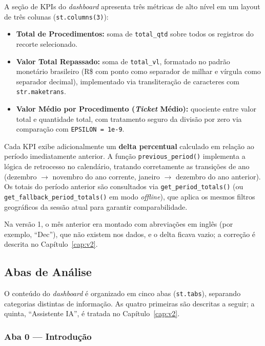 \documentclass[12pt,a4paper]{report}
\begin{document}
A seção de KPIs do \textit{dashboard} apresenta três métricas de alto nível em um
layout de três colunas (\texttt{st.columns(3)}):

\begin{itemize}
    \item \textbf{Total de Procedimentos:} soma de \texttt{total\_qtd} sobre todos os
    registros do recorte selecionado.
    \item \textbf{Valor Total Repassado:} soma de \texttt{total\_vl}, formatado no
    padrão monetário brasileiro (R\$ com ponto como separador de milhar e vírgula como
    separador decimal), implementado via transliteração de caracteres com
    \texttt{str.maketrans}.
    \item \textbf{Valor Médio por Procedimento (\textit{Ticket} Médio):} quociente
    entre valor total e quantidade total, com tratamento seguro da divisão por zero via
    comparação com \texttt{EPSILON = 1e-9}.
\end{itemize}

Cada KPI exibe adicionalmente um \textbf{delta percentual} calculado em relação ao
período imediatamente anterior. A função \texttt{previous\_period()} implementa a
lógica de retrocesso no calendário, tratando corretamente as transições de ano
(dezembro $\rightarrow$ novembro do ano corrente, janeiro $\rightarrow$ dezembro do ano anterior). Os totais
do período anterior são consultados via \texttt{get\_period\_totals()} (ou
\texttt{get\_fallback\_period\_totals()} em modo \textit{offline}), que aplica os mesmos
filtros geográficos da sessão atual para garantir comparabilidade.

Na versão 1, o mês anterior era montado com abreviações em inglês (por exemplo,
``Dec''), que não existem nos dados, e o delta ficava vazio; a correção é descrita no
Capítulo~\ref{cap:v2}.

\subsection{Abas de Análise}

O conteúdo do \textit{dashboard} é organizado em cinco abas
(\texttt{st.tabs}), separando categorias distintas de informação. As quatro primeiras
são descritas a seguir; a quinta, ``Assistente IA'', é tratada no
Capítulo~\ref{cap:v2}.

\subsubsection*{Aba 0 — Introdução}
\end{document}

